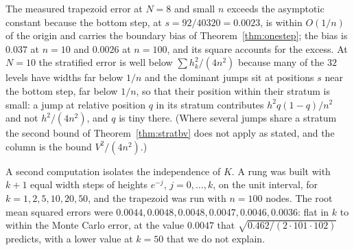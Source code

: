 The measured trapezoid error at $N = 8$ and small $n$ exceeds the asymptotic constant because the bottom step, at $s = 92 / 40320 = 0.0023$, is within $O(1/n)$ of the origin and carries the boundary bias of Theorem~\ref{thm:onestep}; the bias is $0.037$ at $n = 10$ and $0.0026$ at $n = 100$, and its square accounts for the excess. At $N = 10$ the stratified error is well below $\sum h_k^2 / (4 n^2)$ because many of the $32$ levels have widths far below $1/n$ and the dominant jumps sit at positions $s$ near the bottom step, far below $1/n$, so that their position within their stratum is small: a jump at relative position $q$ in its stratum contributes $h^2 q (1-q) / n^2$ and not $h^2 / (4 n^2)$, and $q$ is tiny there. (Where several jumps share a stratum the second bound of Theorem~\ref{thm:stratbv} does not apply as stated, and the column is the bound $V^2/(4n^2)$.)

A second computation isolates the independence of $K$. A rung was built with $k + 1$ equal width steps of heights $e^{-j}$, $j = 0, \dots, k$, on the unit interval, for $k = 1, 2, 5, 10, 20, 50$, and the trapezoid was run with $n = 100$ nodes. The root mean squared errors were $0.0044, 0.0048, 0.0048, 0.0047, 0.0046, 0.0036$: flat in $k$ to within the Monte Carlo error, at the value $0.0047$ that $\sqrt{0.462 / (2 \cdot 101 \cdot 102)}$ predicts, with a lower value at $k = 50$ that we do not explain.

